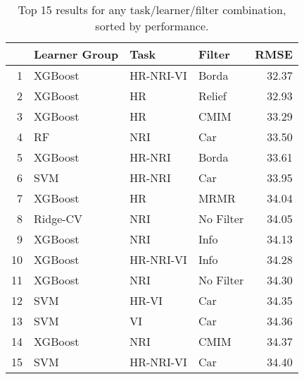 \begin{table}[ht!]
\centering
\caption{Top 15 results for any task/learner/filter combination, sorted by performance.} 
\label{tab:perf-top-15}
\begin{tabular}{rlllr}
  \hline
 & Learner Group & Task & Filter & RMSE \\ 
  \hline
1 & XGBoost & HR-NRI-VI & Borda & 32.37 \\ 
  2 & XGBoost & HR & Relief & 32.93 \\ 
  3 & XGBoost & HR & CMIM & 33.29 \\ 
  4 & RF & NRI & Car & 33.50 \\ 
  5 & XGBoost & HR-NRI & Borda & 33.61 \\ 
  6 & SVM & HR-NRI & Car & 33.95 \\ 
  7 & XGBoost & HR & MRMR & 34.04 \\ 
  8 & Ridge-CV & NRI & No Filter & 34.05 \\ 
  9 & XGBoost & NRI & Info & 34.13 \\ 
  10 & XGBoost & HR-NRI-VI & Info & 34.28 \\ 
  11 & XGBoost & NRI & No Filter & 34.30 \\ 
  12 & SVM & HR-VI & Car & 34.35 \\ 
  13 & SVM & VI & Car & 34.36 \\ 
  14 & XGBoost & NRI & CMIM & 34.37 \\ 
  15 & SVM & HR-NRI-VI & Car & 34.40 \\ 
   \hline
\end{tabular}
\end{table}
